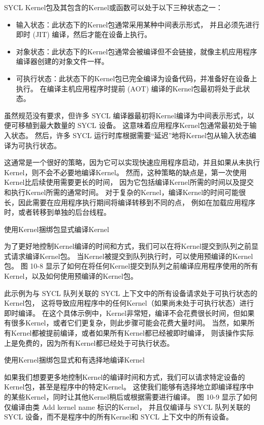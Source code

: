 SYCL Kernel包及其包含的Kernel或函数可以处于以下三种状态之一：

\begin{itemize}
	\item 输入状态：此状态下的Kernel包通常采用某种中间表示形式，
	并且必须先进行即时 (JIT) 编译，然后才能在设备上执行。

	\item 对象状态：此状态下的Kernel包通常会被编译但不会链接，就像主机应用程序编译器创建的对象文件一样。

	\item 可执行状态：此状态下的Kernel包已完全编译为设备代码，并准备好在设备上执行。 
	在编译主机应用程序时提前 (AOT) 编译的Kernel包最初将处于此状态。
\end{itemize}

虽然规范没有要求，但许多 SYCL 编译器最初将Kernel编译为中间表示形式，以便可移植到最大数量的 SYCL 设备。 
这意味着应用程序Kernel包通常最初处于输入状态。 
然后，许多 SYCL 运行时库根据需要“延迟”地将Kernel包从输入状态编译为可执行状态。

这通常是一个很好的策略，因为它可以实现快速应用程序启动，并且如果从未执行Kernel，则不会不必要地编译Kernel。 
然而，这种策略的缺点是，第一次使用Kernel比后续使用需要更长的时间，
因为它包括编译Kernel所需的时间以及提交和执行Kernel所需的通常时间。 
对于复杂的Kernel，编译Kernel的时间可能很长，因此需要在应用程序执行期间将编译转移到不同的点，
例如在加载应用程序时，或者转移到单独的后台线程。

{\color{red} 使用Kernel捆绑包显式编译Kernel}

为了更好地控制Kernel编译的时间和方式，我们可以在将Kernel提交到队列之前显式请求编译Kernel包。 
当Kernel被提交到队列执行时，可以使用预编译的Kernel包。 
图 10-8 显示了如何在将任何Kernel提交到队列之前编译应用程序使用的所有Kernel，以及如何使用预编译的Kernel包。

此示例为与 SYCL 队列关联的 SYCL 上下文中的所有设备请求处于可执行状态的Kernel包，
这将导致应用程序中的任何Kernel（如果尚未处于可执行状态）进行即时编译。 
在这个具体示例中，Kernel非常短，编译不会花费很长时间，但如果有很多Kernel，或者它们更复杂，则此步骤可能会花费大量时间。 
当然，如果所有Kernel都被提前编译，或者如果所有Kernel都已经被即时编译，
则该操作实际上是免费的，因为所有Kernel都已经处于可执行状态。

{\color{red} 使用Kernel捆绑包显式和有选择地编译Kernel}

如果我们想要更多地控制Kernel的编译时间和方式，我们可以请求特定设备的Kernel包，甚至是程序中的特定Kernel。 
这使我们能够有选择地立即编译程序中的某些Kernel，同时让其他Kernel稍后或根据需要进行编译。 
图 10-9 显示了如何仅编译由类 Add kernel name 标识的Kernel，
并且仅编译与 SYCL 队列关联的 SYCL 设备，而不是程序中的所有Kernel和 SYCL 上下文中的所有设备。

